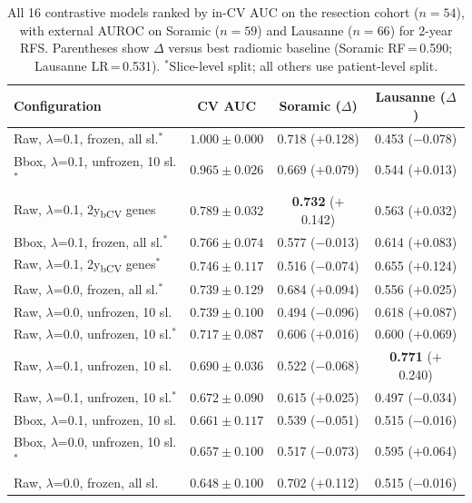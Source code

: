 \documentclass[12pt,twoside]{report}
\begin{document}
\begin{table}[H]
\centering
\small
\caption{All 16 contrastive models ranked by in-CV AUC on the resection cohort ($n=54$),
with external AUROC on Soramic ($n=59$) and Lausanne ($n=66$) for 2-year RFS.
Parentheses show $\Delta$ versus best radiomic baseline
(Soramic RF\,=\,0.590; Lausanne LR\,=\,0.531).
$^{*}$Slice-level split; all others use patient-level split.}
\label{tab:external_eval}
\begin{tabular}{p{5.8cm}ccc}
\hline
Configuration & CV AUC & Soramic ($\Delta$) & Lausanne ($\Delta$) \\
\hline
Raw, $\lambda$=0.1, frozen, all sl.$^{*}$             & $1.000 \pm 0.000$ & 0.718 ($+$0.128) & 0.453 ($-$0.078) \\
Bbox, $\lambda$=0.1, unfrozen, 10 sl.$^{*}$           & $0.965 \pm 0.026$ & 0.669 ($+$0.079) & 0.544 ($+$0.013) \\
Raw, $\lambda$=0.1, 2y\textsubscript{bCV} genes       & $0.789 \pm 0.032$ & \textbf{0.732} ($+$0.142) & 0.563 ($+$0.032) \\
Bbox, $\lambda$=0.1, frozen, all sl.$^{*}$            & $0.766 \pm 0.074$ & 0.577 ($-$0.013) & 0.614 ($+$0.083) \\
Raw, $\lambda$=0.1, 2y\textsubscript{bCV} genes$^{*}$ & $0.746 \pm 0.117$ & 0.516 ($-$0.074) & 0.655 ($+$0.124) \\
Raw, $\lambda$=0.0, frozen, all sl.$^{*}$             & $0.739 \pm 0.129$ & 0.684 ($+$0.094) & 0.556 ($+$0.025) \\
Raw, $\lambda$=0.0, unfrozen, 10 sl.                  & $0.739 \pm 0.100$ & 0.494 ($-$0.096) & 0.618 ($+$0.087) \\
Raw, $\lambda$=0.0, unfrozen, 10 sl.$^{*}$            & $0.717 \pm 0.087$ & 0.606 ($+$0.016) & 0.600 ($+$0.069) \\
Raw, $\lambda$=0.1, unfrozen, 10 sl.                  & $0.690 \pm 0.036$ & 0.522 ($-$0.068) & \textbf{0.771} ($+$0.240) \\
Raw, $\lambda$=0.1, unfrozen, 10 sl.$^{*}$            & $0.672 \pm 0.090$ & 0.615 ($+$0.025) & 0.497 ($-$0.034) \\
Bbox, $\lambda$=0.1, unfrozen, 10 sl.                 & $0.661 \pm 0.117$ & 0.539 ($-$0.051) & 0.515 ($-$0.016) \\
Bbox, $\lambda$=0.0, unfrozen, 10 sl.$^{*}$           & $0.657 \pm 0.100$ & 0.517 ($-$0.073) & 0.595 ($+$0.064) \\
Raw, $\lambda$=0.0, frozen, all sl.                   & $0.648 \pm 0.100$ & 0.702 ($+$0.112) & 0.515 ($-$0.016) \\

\end{tabular}
\end{table}
\end{document}

